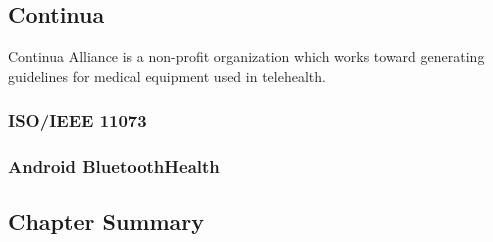 \subsection{Continua}
\label{sub:continua}
Continua Alliance is a non-profit organization which works toward generating guidelines for medical equipment used in telehealth. 

\subsubsection{ISO/IEEE 11073}
\label{subsub:ieee11073}

\subsubsection{Android BluetoothHealth}
\label{subsub:bthealth}

\subsection{Chapter Summary}
\label{sub:backSum}
